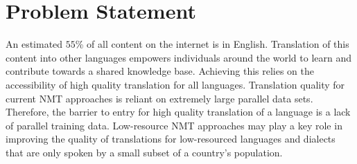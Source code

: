 %
%
%
%
%


\section{Problem Statement}
An estimated $55$\% of all content on the internet is in English. Translation of this content into other languages empowers individuals around the world to learn and contribute towards a shared knowledge base. Achieving this relies on the accessibility of high quality translation for all languages. Translation quality for current \acrshort{NMT} approaches is reliant on extremely large parallel data sets. Therefore, the barrier to entry for high quality translation of a language is a lack of parallel training data. Low-resource \acrshort{NMT} approaches may play a key role in improving the quality of translations for low-resourced languages and dialects that are only spoken by a small subset of a country's population.

